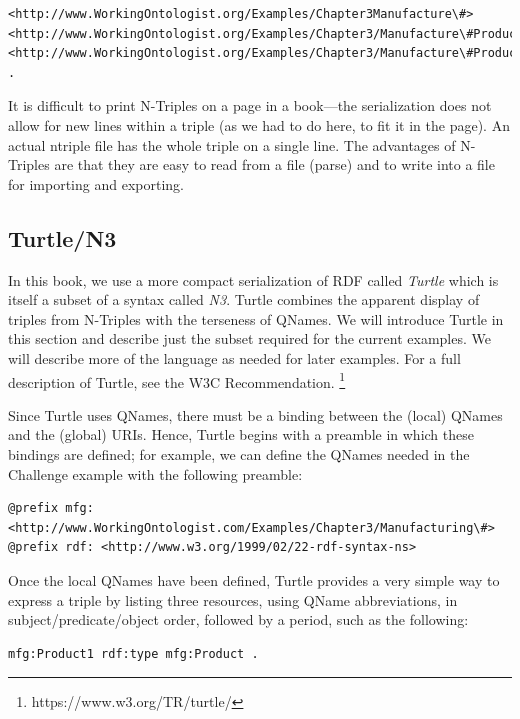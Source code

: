 \begin{lstlisting}
<http://www.WorkingOntologist.org/Examples/Chapter3Manufacture\#> <http://www.WorkingOntologist.org/Examples/Chapter3/Manufacture\#Product1> <http://www.WorkingOntologist.org/Examples/Chapter3/Manufacture\#Product> .
\end{lstlisting}

It is difficult to print N-Triples on a page in a book---the
serialization does not allow for new lines within a triple (as we had to
do here, to fit it in the page). An actual ntriple file has the whole
triple on a single line. The advantages of N-Triples are that they are
easy to read from a file (parse) and to write into a file for importing
and exporting.

\subsection{Turtle/N3}

In this book, we use a more compact serialization of RDF called
\emph{Turtle} which is itself a subset of a syntax called \emph{N3}. Turtle
combines the apparent display of triples from N-Triples with the
terseness of QNames. We will introduce Turtle in this section and
describe just the subset required for the current examples. We will
describe more of the language as needed for later examples. For a full
description of Turtle, see the W3C Recommendation. \footnote{https://www.w3.org/TR/turtle/}

Since Turtle uses QNames, there must be a binding between the (local)
QNames and the (global) URIs. Hence, Turtle begins with a preamble in
which these bindings are defined; for example, we can define the QNames
needed in the Challenge example with the following preamble:

\begin{lstlisting}
@prefix mfg: <http://www.WorkingOntologist.com/Examples/Chapter3/Manufacturing\#>
@prefix rdf: <http://www.w3.org/1999/02/22-rdf-syntax-ns> 
\end{lstlisting}

Once the local QNames have been defined, Turtle provides a very simple
way to express a triple by listing three resources, using QName
abbreviations, in subject/predicate/object order, followed by a period,
such as the following:

\begin{lstlisting}
mfg:Product1 rdf:type mfg:Product .
\end{lstlisting}

